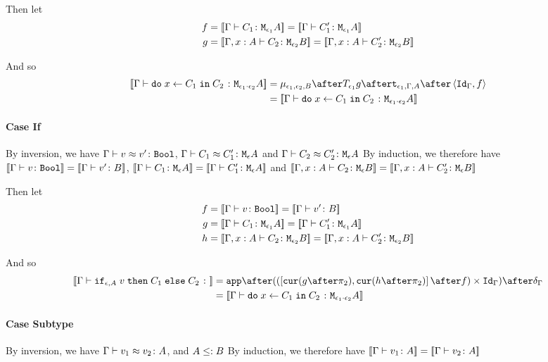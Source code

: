 {Then let
\begin{align}
    f &{}=\deno{\gtyperelation{C_1}{\M{\e_1}{A}}}= \deno{\gtyperelation{C_1'}{\M{\e_1}{A}}}\\
    g &{}=\deno{\typerelation{\gax}{C_2}{\M{\e_2}{B}}} = \deno{\typerelation{\gax}{C_2'}{\M{\e_2}{B}}}
\end{align}



And so
\begin{equation}
    \begin{split}
        \deno{\gtyperelation{\doin{x}{C_1}{C_2}}{\M{\e_1\dot\e_2}{A}}} & = \bind{\e_1}{\e_2}{B} \after \T{\e_1}{g} \after \tstrength{\e_1}{\G}{A} \after \pr{\idg}{f}\\
         & = \deno{\gtyperelation{\doin{x}{C_1}{C_2}}{\M{\e_1\dot\e_2}{A}}}
    \end{split}
\end{equation}
\paragraph{Case If}
By inversion, we have $\Gamma \vdash v \approx v' \colon \texttt{Bool}$, $\Gamma \vdash C_1 \approx C_1' \colon \texttt{M}_{\epsilon}{A}$ and $\Gamma \vdash C_2 \approx C_2' \colon \texttt{M}_{\epsilon}{A}$
By induction, we therefore have ${\bf [\![}\Gamma \vdash v \colon \texttt{Bool}{\bf ]\!]} = {\bf [\![}\Gamma \vdash v' \colon B{\bf ]\!]}$, ${\bf [\![}\Gamma \vdash C_1 \colon \texttt{M}_{\epsilon}{A}{\bf ]\!]}= {\bf [\![}\Gamma \vdash C_1' \colon \texttt{M}_{\epsilon}{A}{\bf ]\!]}$ and ${\bf [\![}\Gamma, x: A \vdash C_2 \colon \texttt{M}_{\epsilon}{B}{\bf ]\!]} = {\bf [\![}\Gamma, x: A \vdash C_2' \colon \texttt{M}_{\epsilon}{B}{\bf ]\!]}$

Then let
\begin{align}
    f &{}=\deno{\gtyperelation{v}{\B}} = \deno{\gtyperelation{v'}{B}}\\
    g &{}=\deno{\gtyperelation{C_1}{\M{\e_1}{A}}}= \deno{\gtyperelation{C_1'}{\M{\e_1}{A}}}\\
    h &{}=\deno{\typerelation{\gax}{C_2}{\M{\e_2}{B}}} = \deno{\typerelation{\gax}{C_2'}{\M{\e_2}{B}}}
\end{align}



And so
\begin{equation}
    \begin{split}
        \deno{\gtyperelation{\ifthenelse{\e}{A}{v}{C_1}{C_2}}} & = \ifMorph{f}{g}{h}\\
         & = \deno{\gtyperelation{\doin{x}{C_1}{C_2}}{\M{\e_1\dot\e_2}{A}}}
    \end{split}
\end{equation}
\paragraph{Case Subtype}
By inversion, we have $\Gamma \vdash v_1 \approx v_2 \colon A$, and $A \leq: B$ 
By induction, we therefore have ${\bf [\![}\Gamma \vdash v_1 \colon A{\bf ]\!]} = {\bf [\![}\Gamma \vdash v_2 \colon A{\bf ]\!]}$

}
